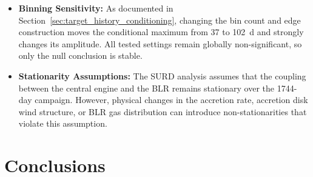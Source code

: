 \documentclass[fleqn,usenatbib]{mnras}
\begin{document}
\begin{itemize}
\item \textbf{Binning Sensitivity:} As documented in Section~\ref{sec:target_history_conditioning}, changing the bin count and edge construction moves the conditional maximum from 37 to 102~d and strongly changes its amplitude. All tested settings remain globally non-significant, so only the null conclusion is stable.
\item \textbf{Stationarity Assumptions:} The SURD analysis assumes that the coupling between the central engine and the BLR remains stationary over the 1744-day campaign. However, physical changes in the accretion rate, accretion disk wind structure, or BLR gas distribution can introduce non-stationarities that violate this assumption.
\end{itemize}

\section{Conclusions}
\label{sec:conclusion}
\end{document}
